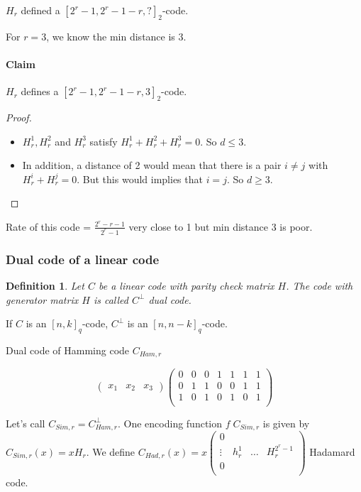 \documentclass{article}
\newtheorem{defi}{Definition}
\begin{document}
$H_r$ defined a $[2^r -1, 2^r - 1 - r, ?]_2$-code.

For $r=3$, we know the min distance is 3.

\paragraph{Claim} $H_r$ defines a $[2^r-1, 2^r-1-r,3]_2$-code.


\begin{proof}
\begin{itemize}
\item $H_r^1, H_r^2$ and $H_r^3$ satisfy $H_r^1+H_r^2+H_r^3 = 0$. So $d\leq 3$.
\item In addition, a distance of 2 would mean that there is a pair $i\neq j$ with $H_r^i + H_r^j = 0$. But this would implies that $i=j$. So $d\geq 3$.
\end{itemize}
\end{proof}

Rate of this code = $\frac{2^r-r-1}{2^r-1}$ very close to 1 but min distance 3 is poor.

\subsubsection*{Dual code of a linear code}
\begin{defi}
Let $C$ be a linear code with parity check matrix $H$. The code with generator matrix $H$ is called $C^\perp$ dual code. 
\end{defi}

If $C$ is an $[n,k]_q$-code, $C^\perp$ is an $[n,n-k]_q$-code.

Dual code of Hamming code $C_{Ham,r}$


\[\begin{pmatrix}
x_1 & x_2 & x_3
\end{pmatrix}
\begin{pmatrix}
0 & 0 & 0 & 1 & 1 & 1 & 1\\
0 & 1 & 1 & 0 & 0 & 1 & 1\\
1 & 0 & 1 & 0 & 1 & 0 & 1\\
\end{pmatrix}
\]

Let's call $C_{Sim,r}=C^\perp_{Ham,r}$. One encoding function $f \; C_{Sim,r}$ is given by $C_{Sim,r}(x)=xH_r$. We define $C_{Had,r}(x)=x
\begin{pmatrix}
0 & & & \\
\vdots & h_r^1 & \hdots & H_r^{2^r - 1}\\
0 & & &\\
\end{pmatrix}
$ Hadamard code.
\end{document}
